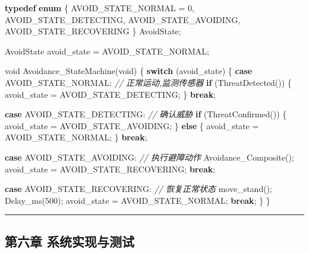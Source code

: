 \documentclass[
]{article}
\newenvironment{Shaded}{}{}
\newcommand{\CommentTok}[1]{\textcolor[rgb]{0.38,0.63,0.69}{\textit{#1}}}
\newcommand{\ControlFlowTok}[1]{\textcolor[rgb]{0.00,0.44,0.13}{\textbf{#1}}}
\newcommand{\DataTypeTok}[1]{\textcolor[rgb]{0.56,0.13,0.00}{#1}}
\newcommand{\DecValTok}[1]{\textcolor[rgb]{0.25,0.63,0.44}{#1}}
\newcommand{\KeywordTok}[1]{\textcolor[rgb]{0.00,0.44,0.13}{\textbf{#1}}}
\newcommand{\NormalTok}[1]{#1}
\begin{document}
\begin{Shaded}
\begin{Highlighting}[]
\KeywordTok{typedef} \KeywordTok{enum}\NormalTok{ \{}
\NormalTok{    AVOID\_STATE\_NORMAL = }\DecValTok{0}\NormalTok{,}
\NormalTok{    AVOID\_STATE\_DETECTING,}
\NormalTok{    AVOID\_STATE\_AVOIDING,}
\NormalTok{    AVOID\_STATE\_RECOVERING}
\NormalTok{\} AvoidState;}

\NormalTok{AvoidState avoid\_state = AVOID\_STATE\_NORMAL;}

\DataTypeTok{void}\NormalTok{ Avoidance\_StateMachine(}\DataTypeTok{void}\NormalTok{)}
\NormalTok{\{}
    \ControlFlowTok{switch}\NormalTok{ (avoid\_state) \{}
        \ControlFlowTok{case}\NormalTok{ AVOID\_STATE\_NORMAL:}
            \CommentTok{// 正常运动,监测传感器}
            \ControlFlowTok{if}\NormalTok{ (ThreatDetected()) \{}
\NormalTok{                avoid\_state = AVOID\_STATE\_DETECTING;}
\NormalTok{            \}}
            \ControlFlowTok{break}\NormalTok{;}
            
        \ControlFlowTok{case}\NormalTok{ AVOID\_STATE\_DETECTING:}
            \CommentTok{// 确认威胁}
            \ControlFlowTok{if}\NormalTok{ (ThreatConfirmed()) \{}
\NormalTok{                avoid\_state = AVOID\_STATE\_AVOIDING;}
\NormalTok{            \} }\ControlFlowTok{else}\NormalTok{ \{}
\NormalTok{                avoid\_state = AVOID\_STATE\_NORMAL;}
\NormalTok{            \}}
            \ControlFlowTok{break}\NormalTok{;}
            
        \ControlFlowTok{case}\NormalTok{ AVOID\_STATE\_AVOIDING:}
            \CommentTok{// 执行避障动作}
\NormalTok{            Avoidance\_Composite();}
\NormalTok{            avoid\_state = AVOID\_STATE\_RECOVERING;}
            \ControlFlowTok{break}\NormalTok{;}
            
        \ControlFlowTok{case}\NormalTok{ AVOID\_STATE\_RECOVERING:}
            \CommentTok{// 恢复正常状态}
\NormalTok{            move\_stand();}
\NormalTok{            Delay\_ms(}\DecValTok{500}\NormalTok{);}
\NormalTok{            avoid\_state = AVOID\_STATE\_NORMAL;}
            \ControlFlowTok{break}\NormalTok{;}
\NormalTok{    \}}
\NormalTok{\}}
\end{Highlighting}
\end{Shaded}

\begin{center}\rule{0.5\linewidth}{0.5pt}\end{center}

\hypertarget{ux7b2cux516dux7ae0-ux7cfbux7edfux5b9eux73b0ux4e0eux6d4bux8bd5}{%
\subsection{第六章
系统实现与测试}\label{ux7b2cux516dux7ae0-ux7cfbux7edfux5b9eux73b0ux4e0eux6d4bux8bd5}}
\end{document}
